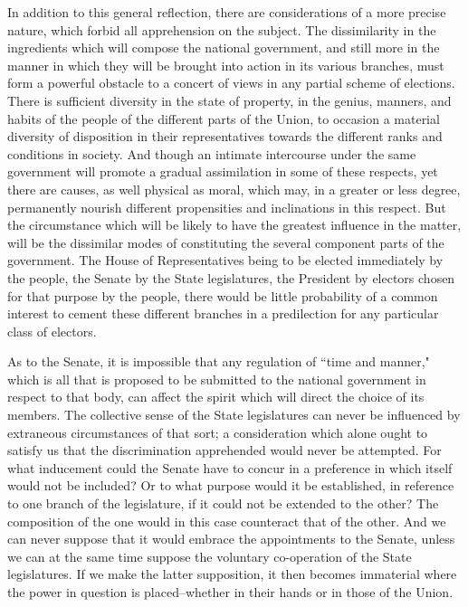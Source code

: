 In addition to this general reflection, there are considerations of a more precise nature, which forbid all apprehension on the subject. 
The dissimilarity in the ingredients which will compose the national government, and still more in the manner in which they will be brought into action in its various branches, must form a powerful obstacle to a concert of views in any partial scheme of elections. 
There is sufficient diversity in the state of property, in the genius, manners, and habits of the people of the different parts of the Union, to occasion a material diversity of disposition in their representatives towards the different ranks and conditions in society. 
And though an intimate intercourse under the same government will promote a gradual assimilation in some of these respects, yet there are causes, as well physical as moral, which may, in a greater or less degree, permanently nourish different propensities and inclinations in this respect. 
But the circumstance which will be likely to have the greatest influence in the matter, will be the dissimilar modes of constituting the several component parts of the government. 
The House of Representatives being to be elected immediately by the people, the Senate by the State legislatures, the President by electors chosen for that purpose by the people, there would be little probability of a common interest to cement these different branches in a predilection for any particular class of electors.

As to the Senate, it is impossible that any regulation of ``time and manner," which is all that is proposed to be submitted to the national government in respect to that body, can affect the spirit which will direct the choice of its members. 
The collective sense of the State legislatures can never be influenced by extraneous circumstances of that sort; a consideration which alone ought to satisfy us that the discrimination apprehended would never be attempted. 
For what inducement could the Senate have to concur in a preference in which itself would not be included? 
Or to what purpose would it be established, in reference to one branch of the legislature, if it could not be extended to the other? 
The composition of the one would in this case counteract that of the other. 
And we can never suppose that it would embrace the appointments to the Senate, unless we can at the same time suppose the voluntary co-operation of the State legislatures. 
If we make the latter supposition, it then becomes immaterial where the power in question is placed--whether in their hands or in those of the Union.


